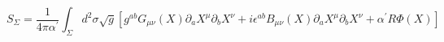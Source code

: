 \begin{equation}
S_{\Sigma}=\frac{1}{4\pi\alpha^\prime}\int_\Sigma d^2\sigma\sqrt g
[g^{ab}G_{\mu\nu}(X)\partial_a X^\mu\partial_b X^\nu+
i\epsilon^{ab}B_{\mu\nu}(X)\partial_a X^\mu\partial_bX^\nu+
\alpha^\prime R\Phi(X)]
\end{equation}

